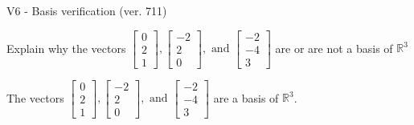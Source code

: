 \begin{exercise}
  \begin{exerciseTitle}V6 - Basis verification (ver. 711)\end{exerciseTitle}
  \begin{exerciseStatement}
    Explain why the vectors \(\left[\begin{array}{r}
0 \\
2 \\
1
\end{array}\right] , \left[\begin{array}{r}
-2 \\
2 \\
0
\end{array}\right] , \text{ and } \left[\begin{array}{r}
-2 \\
-4 \\
3
\end{array}\right]\) are or are not a basis of \(\mathbb{R}^3\)	


  \end{exerciseStatement}
  \begin{exerciseAnswer}
   The vectors \(\left[\begin{array}{r}
0 \\
2 \\
1
\end{array}\right] , \left[\begin{array}{r}
-2 \\
2 \\
0
\end{array}\right] , \text{ and } \left[\begin{array}{r}
-2 \\
-4 \\
3
\end{array}\right]\) 
  	 are  a basis of \(\mathbb{R}^3\).
  


  \end{exerciseAnswer}
\end{exercise}